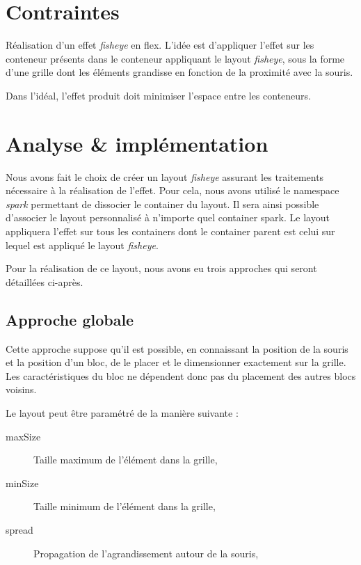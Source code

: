 \section{Contraintes}
Réalisation d'un effet \emph{fisheye} en flex. L'idée est d'appliquer l'effet sur les conteneur présents dans le conteneur appliquant le layout \emph{fisheye}, sous la forme d'une grille dont les éléments grandisse en fonction de la proximité avec la souris.

Dans l'idéal, l'effet produit doit minimiser l'espace entre les conteneurs.

\section{Analyse \& implémentation}

Nous avons fait le choix de créer un layout \emph{fisheye} assurant les traitements nécessaire à la réalisation de l'effet. Pour cela, nous avons utilisé le namespace \emph{spark} permettant de dissocier le container du layout. Il sera ainsi possible d'associer le layout personnalisé à n'importe quel container spark. Le layout appliquera l'effet sur tous les containers dont le container parent est celui sur lequel est appliqué le layout \emph{fisheye}.

Pour la réalisation de ce layout, nous avons eu trois approches qui seront détaillées ci-après.

\subsection{Approche globale}
\label{subsec:globale}
Cette approche suppose qu'il est possible, en connaissant la position de la souris et la position d'un bloc, de le placer et le dimensionner exactement sur la grille. Les caractéristiques du bloc ne dépendent donc pas du placement des autres blocs voisins.

Le layout peut être paramétré de la manière suivante :

\begin{description}
  \item[maxSize] Taille maximum de l'élément dans la grille,
  \item[minSize] Taille minimum de l'élément dans la grille,
  \item[spread] Propagation de l'agrandissement autour de la souris,
\end{description}

